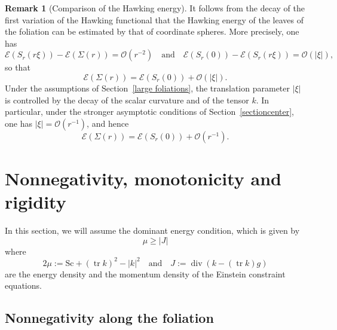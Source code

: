 \documentclass[12pt,a4paper]{amsart}
\theoremstyle{plain}
\theoremstyle{definition}
\newtheorem{remark}[theorem]{Remark}
\newcommand{\diver}{\operatorname{div}}
\newcommand{\tr}{\operatorname{tr}}
\begin{document}
\begin{remark}[Comparison of the Hawking energy]
\label{rmk:EH-comparison}
It follows from the decay of the first variation of the Hawking functional that
the Hawking energy of the leaves of the foliation can be estimated by that of
coordinate spheres. More precisely, one has
\begin{equation}
    \mathcal{E}(S_r(r\xi)) - \mathcal{E}(\Sigma(r)) = \mathcal{O}(r^{-2}) \quad \text{and} \quad  \mathcal{E}(S_r(0)) - \mathcal{E}(S_r(r\xi)) = \mathcal{O}(|\xi|),
\end{equation}
so that
\begin{equation}
    \mathcal{E}(\Sigma(r)) = \mathcal{E}(S_r(0)) + \mathcal{O}(|\xi|).
\end{equation}
Under the assumptions of Section~\ref{large foliations}, the translation
parameter $|\xi|$ is controlled by the decay of the scalar curvature and of
the tensor $k$.  In particular, under the stronger asymptotic conditions of
Section~\ref{sectioncenter}, one has $|\xi| = \mathcal{O}(r^{-1})$, and hence
   \begin{equation}
        \mathcal{E}(\Sigma(r)) = \mathcal{E}(S_r(0)) + \mathcal{O}(r^{-1}).
\end{equation}
\end{remark}
\section{Nonnegativity, monotonicity and rigidity}\label{rigifoligene}

 In this section, we will assume the dominant energy condition, which is  given by 
\begin{equation}
    \mu \geq |J|
\end{equation}
where 
\begin{equation}
     2 \mu:=\mathrm{Sc} + (\tr k)^2 - |k|^2 \quad \text{and} \quad  J:=\diver (k -(\tr k) g)
\end{equation}
are the energy density and the momentum density of the Einstein constraint equations. 


\subsection{Nonnegativity along the foliation}
\end{document}
